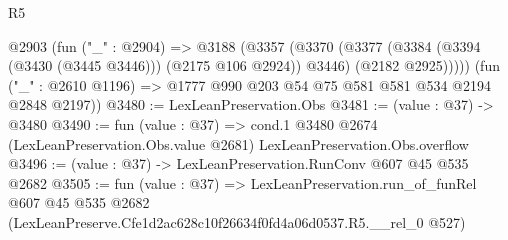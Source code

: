 \begin{lexlean}{R5}
\begin{coremodule}
      @2903
        (fun ("_" : @2904) =>
        @3188
          (@3357
            (@3370
              (@3377 (@3384 (@3394 (@3430 (@3445 @3446))) (@2175 @106 @2924)) @3446)
              (@2182 @2925)))))
      (fun ("_" : @2610 @1196) => @1777 @990 @203 @54 @75 @581 @581 @534 @2194 @2848 @2197))
@3480 := LexLeanPreservation.Obs
@3481 := (value : @37) -> @3480
@3490 := fun (value : @37) =>
  cond.{1} @3480 @2674 (LexLeanPreservation.Obs.value @2681) LexLeanPreservation.Obs.overflow
@3496 := (value : @37) -> LexLeanPreservation.RunConv @607 @45 @535 @2682
@3505 := fun (value : @37) =>
  LexLeanPreservation.run_of_funRel
    @607
    @45
    @535
    @2682
    (LexLeanPreserve.Cfe1d2ac628c10f26634f0fd4a06d0537.R5.__rel_0 @527)
\end{coremodule}
\end{lexlean}
